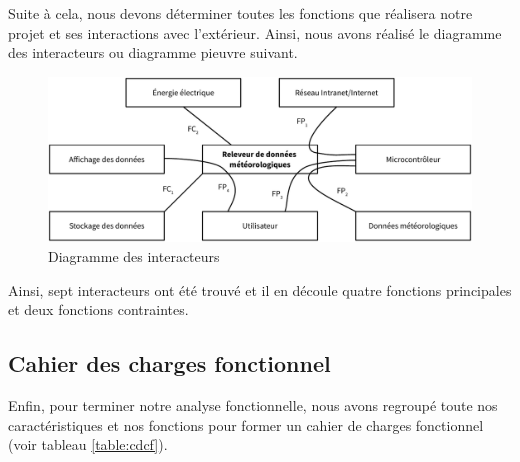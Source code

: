 Suite à cela, nous devons déterminer toutes les fonctions que réalisera notre projet et ses interactions avec l'extérieur. Ainsi, nous avons réalisé le diagramme des interacteurs ou diagramme \og pieuvre \fg suivant.

\begin{figure}[!h]
	\centering
	\includegraphics[width=\linewidth]{Images/Diagramme_pieuvre}
	\caption{Diagramme des interacteurs}
\end{figure}

Ainsi, sept interacteurs ont été trouvé et il en découle quatre fonctions principales et deux fonctions contraintes.

\subsection{Cahier des charges fonctionnel}

Enfin, pour terminer notre analyse fonctionnelle, nous avons regroupé toute nos caractéristiques et nos fonctions pour former un cahier de charges fonctionnel (voir tableau \ref{table:cdcf}).

